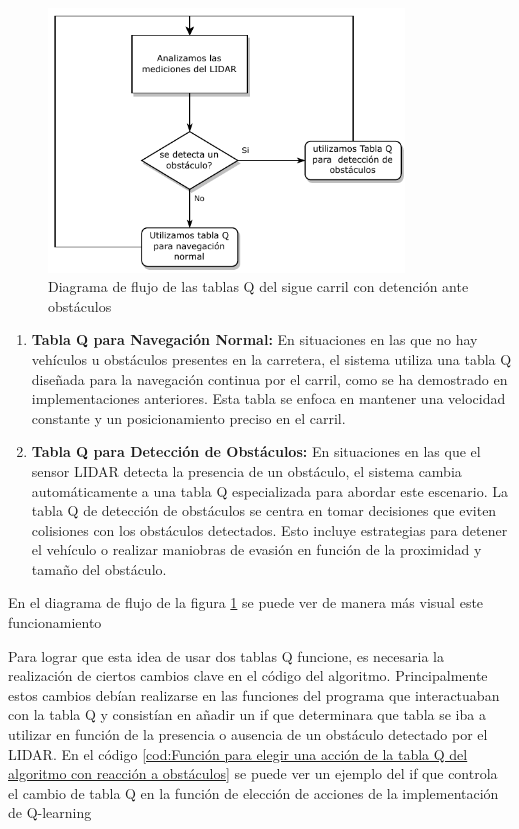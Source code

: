  \begin{figure}[h]
    \centering
    \includegraphics[height=7cm]{imagenes/cap4/evita_obstaculos_qlearning/diagrama_tabla_q.pdf}
    \caption{Diagrama de flujo de las tablas Q del sigue carril con detención ante obstáculos}
    \label{fig:Diagrama de flujo de las tablas Q del algoritmo con detencion ante obstáculos}
\end{figure}

\begin{enumerate}
    \item \textbf{Tabla Q para Navegación Normal:} En situaciones en las que no hay vehículos u obstáculos presentes en la carretera, el sistema utiliza una tabla Q diseñada para la navegación continua por el carril, como se ha demostrado en implementaciones anteriores. Esta tabla se enfoca en mantener una velocidad constante y un posicionamiento preciso en el carril.
    

    \item \textbf{Tabla Q para Detección de Obstáculos:} En situaciones en las que el sensor LIDAR detecta la presencia de un obstáculo, el sistema cambia automáticamente a una tabla Q especializada para abordar este escenario. La tabla Q de detección de obstáculos se centra en tomar decisiones que eviten colisiones con los obstáculos detectados. Esto incluye estrategias para detener el vehículo o realizar maniobras de evasión en función de la proximidad y tamaño del obstáculo.
\end{enumerate}

En el diagrama de flujo de la figura \ref{fig:Diagrama de flujo de las tablas Q del algoritmo con detencion ante obstáculos}  se puede ver de manera más visual este funcionamiento

\bigskip

Para lograr que esta idea de usar dos tablas Q funcione, es necesaria la realización de ciertos cambios clave en el código del algoritmo. Principalmente estos cambios debían realizarse en las funciones del programa que interactuaban con la tabla Q y consistían en añadir un if que determinara que tabla se iba a utilizar en función de la presencia o ausencia de un obstáculo detectado por el LIDAR. En el código \ref{cod:Función para elegir una acción de la tabla Q del algoritmo con reacción a obstáculos} se puede ver un ejemplo del if que controla el cambio de tabla Q en la función de elección de acciones de la implementación de Q-learning

